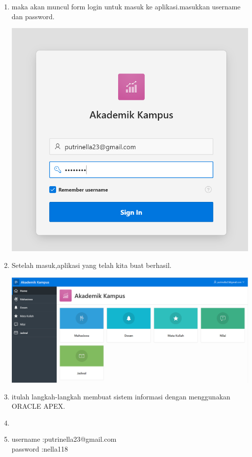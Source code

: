 \documentclass{article}
\begin{document}
\begin{enumerate}
\begin{center}
\end{center}
    \item maka akan muncul form login untuk masuk ke aplikasi.masukkan username dan password.
    \begin{center}
    \includegraphics[width=.8\textwidth]{figure/37.PNG}
\end{center}
    \item Setelah masuk,aplikasi yang telah kita buat berhasil.
    \begin{center}
    \includegraphics[width=.8\textwidth]{figure/38.PNG}
\end{center}
  
    \item itulah langkah-langkah membuat sistem informasi dengan menggunakan ORACLE APEX.
    \item \usepackage{https://apex.oracle.com/pls/apex/f?p=93031:LOGIN_DESKTOP:700115047311535:::::} 
    \item username :putrinella23@gmail.com\\
          password :nella118
\end{enumerate}
\end{document}
